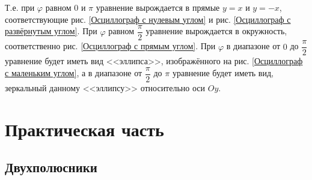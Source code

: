 \documentclass[a4paper, usenames, dvipsnames]{article}
\begin{document}
Т.е. при $\varphi$ равном $0$ и $\pi$ уравнение вырождается в прямые $y = x$ и $y = -x$,
соответствующие рис. \ref{Осциллограф с нулевым углом} и рис. \ref{Осциллограф с развёрнутым углом}.
При $\varphi$ равном $\dfrac{\pi}{2}$ уравнение вырождается в окружность, соответственно рис. \ref{Осциллограф с прямым углом}.
При $\varphi$ в диапазоне от $0$ до $\dfrac{\pi}{2}$ уравнение будет иметь вид <<эллипса>>,
изображённого на рис. \ref{Осциллограф с маленьким углом}, а в диапазоне от $\dfrac{\pi}{2}$ до $\pi$ уравнение будет иметь вид,
зеркальный данному <<эллипсу>> относительно оси $Oy$.

\newpage\section*{\centering Практическая часть}

\subsection*{Двухполюсники}
\end{document}

